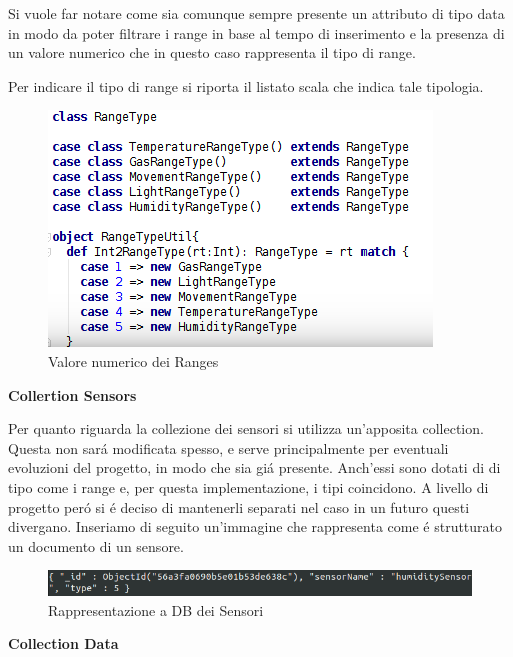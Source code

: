 Si vuole far notare come sia comunque sempre presente un attributo di tipo data in modo da poter filtrare i range in base al tempo di inserimento e la presenza di un valore numerico che in questo caso rappresenta il tipo di range.

Per indicare il tipo di range si riporta il listato scala che indica tale tipologia.

\begin{figure}[ht]
\centering
\includegraphics[scale=0.5,natwidth=610,natheight=642]{Figures/DataStructures/Ranges.png}
\caption{Valore numerico dei Ranges}
\end{figure}

\begin{center}
  \textbf{Collertion Sensors}
\end{center}

Per quanto riguarda la collezione dei sensori si utilizza un'apposita collection. Questa non sar\'a modificata spesso, e serve principalmente per eventuali evoluzioni del progetto, in modo che sia gi\'a presente. Anch'essi sono dotati di di tipo come i range e, per questa implementazione, i tipi coincidono. A livello di progetto per\'o si \'e deciso di mantenerli separati nel caso in un futuro questi divergano. Inseriamo di seguito un'immagine che rappresenta come \'e strutturato un documento di un sensore.

\begin{figure}[ht]
\centering
\includegraphics[scale=0.5,natwidth=610,natheight=642]{Figures/DataStructures/Sensors.png}
\caption{Rappresentazione a DB dei Sensori}
\end{figure}

\begin{center}
\textbf{Collection Data}
\end{center}

